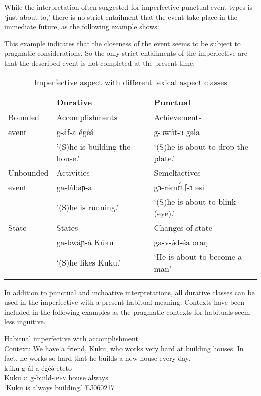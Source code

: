 While the interpretation often suggested for imperfective punctual event types is `just about to,' there is no strict entailment that the event take place in the immediate future, as the following example shows:


This example indicates that the closeness of the event seems to be subject to pragmatic considerations. So the only strict entailments of the imperfective are that the described event is not completed at the present time.


\begin{table}
\begin{tabular}{lll}
\lsptoprule
			&	Durative 						&	Punctual \\
			\midrule 
Bounded		&	Accomplishments 				&	Achievements \\
event		&  g-áf-a égéə́    						&	g-ɜwút-ɜ gəla \\ 
			& '(S)he is building the house.' 	& `(S)he is about to drop the plate.' \\
\midrule
Unbounded	&  Activities			& 	Semelfactives \\
event		&  ga-lál:əɲ-a			&	gɜ-rə́mɛ́tʃ-ɜ əsi\\ 
			& '(S)he is running.' 	&   `(S)he is about to blink (eye).'\\%
\midrule 
State		&  States 				&   Changes of state\\
			&  ga-bwáɲ-á Kúku		& 	ga-v-ə́d-éa oraŋ\\
			&  `(S)he likes Kuku.'	&   `He is about to become a man' \\
\lspbottomrule
\end{tabular}	
\caption{Imperfective aspect with different lexical aspect classes}\label{tab:ch11:ipfvasp}
\end{table}

In addition to punctual and inchoative interpretations, all durative classes can be used in the imperfective with a present habitual meaning. Contexts have been included in the following examples as the pragmatic contexts for habituals seem less inguitive.

\ea Habitual imperfective with accomplishment\\
	Context: We have a friend, Kuku, who works very hard at building houses. In fact, he works so hard that he builds a new house every day.\\
		\gll kúku g-áf-a égéə́    eteto\\
			Kuku \textsc{cl}g-build-\textsc{ipfv} house always\\
		\glt `Kuku is always building.'  \hfill EJ060217

